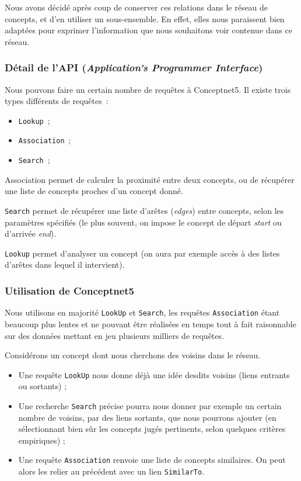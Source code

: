 \documentclass[a4paper, 12pt]{article}
\newcommand{\ang}[1]{\textit{#1}}%
\begin{document}
Nous avons décidé après coup de conserver ces relations dans le réseau de concepts, et d'en utiliser un sous-ensemble. En effet, elles nous paraissent bien adaptées pour exprimer l'information que nous souhaitons voir contenue dans ce réseau.

\subsubsection{Détail de l'API (\ang{Application's Programmer Interface})}

Nous pouvons faire un certain nombre de requêtes à Conceptnet5. Il existe trois types différents de requêtes~:
\begin{itemize}
 \item \texttt{Lookup}~;
 \item \texttt{Association}~;
 \item \texttt{Search}~;
\end{itemize}
Association permet de calculer la proximité entre deux concepts, ou de récupérer une liste de concepts proches d'un concept donné.

\texttt{Search} permet de récupérer une liste d'arêtes (\ang{edges}) entre concepts, selon les paramètres spécifiés (le plus souvent, on impose le concept de départ \ang{start} ou d'arrivée \ang{end}).

\texttt{Lookup} permet d'analyser un concept (on aura par exemple accès à des listes d'arêtes dans lequel il intervient).


\subsubsection{Utilisation de Conceptnet5}

Nous utilisons en majorité \texttt{LookUp} et \texttt{Search}, les requêtes \texttt{Association} étant beaucoup plus lentes et ne pouvant être réalisées en temps tout à fait raisonnable sur des données mettant en jeu plusieurs milliers de requêtes.

Considérons un concept dont nous cherchons des voisins dans le réseau.
\begin{itemize}
 \item Une requête \verb|LookUp| nous donne déjà une idée desdits voisins (liens entrants ou sortants) ;
 \item Une recherche \verb|Search| précise pourra nous donner par exemple un certain nombre de voisins, par des liens sortants, que nous pourrons ajouter (en sélectionnant bien sûr les concepts jugés pertinents, selon quelques critères empiriques) ;
 \item Une requête \verb|Association| renvoie une liste de concepts similaires. On peut alors les relier au précédent avec un lien \verb|SimilarTo|.
\end{itemize}
\end{document}
